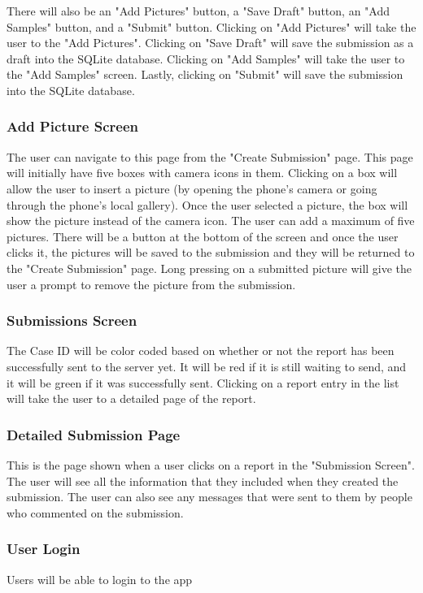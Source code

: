 \documentclass[onecolumn, draftclsnofoot, article, 10pt, compsoc]{IEEEtran}
\begin{document}
There will also be an "Add Pictures" button, a "Save Draft" button, an "Add Samples" button, and a "Submit" button. Clicking on "Add Pictures" will take the user to the "Add Pictures". Clicking on "Save Draft" will save the submission as a draft into the SQLite database. Clicking on "Add Samples" will take the user to the "Add Samples" screen. Lastly, clicking on "Submit" will save the submission into the SQLite database.

\subsubsection{Add Picture Screen} 
The user can navigate to this page from the "Create Submission" page. This page will initially have five boxes with camera icons in them. Clicking on a box will allow the user to insert a picture (by opening the phone's camera or going through the phone's local gallery). Once the user selected a picture, the box will show the picture instead of the camera icon. The user can add a maximum of five pictures. There will be a button at the bottom of the screen and once the user clicks it, the pictures will be saved to the submission and they will be returned to the "Create Submission" page. Long pressing on a submitted picture will give the user a prompt to remove the picture from the submission.




\subsubsection{Submissions Screen}
The Case ID will be color coded based on whether or not the report has been successfully sent to the server yet. It will be red if it is still waiting to send, and it will be green if it was successfully sent. Clicking on a report entry in the list will take the user to a detailed page of the report.


\subsubsection{Detailed Submission Page}
This is the page shown when a user clicks on a report in the "Submission Screen". The user will see all the information that they included when they created the submission. The user can also see any messages that were sent to them by people who commented on the submission.

\subsubsection{User Login}
Users will be able to login to the app
\end{document}
